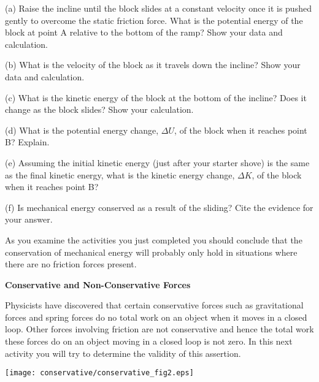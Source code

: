 (a) Raise the incline until the block slides at a constant velocity once it
is pushed gently to overcome the static friction force. What is the potential
energy of the block at point A relative to the bottom of the ramp? Show your
data and calculation.
\vspace{30mm}

\newpage

(b) What is the velocity of the block as it travels down the incline? Show your
data and calculation.
\vspace{20mm}

(c) What is the kinetic energy of the block at the bottom of the incline? Does
it change as the block slides? Show your calculation.
\vspace{20mm}

(d) What is the potential energy change, $\Delta U$, of the block when it reaches point B? Explain.
\vspace{20mm}

(e) Assuming the initial kinetic energy (just after your starter shove) is the
same as the final kinetic energy, what is the kinetic energy change, $\Delta K$, of the block when it reaches point B? 
\vspace{20mm}

(f) Is mechanical energy conserved as a result of the sliding? Cite the evidence for your answer.
\vspace{20mm}

As you examine the activities you just completed you should conclude that the
conservation of mechanical energy will probably only hold in situations where
there are no friction forces present. 

\textbf{Conservative and Non-Conservative Forces} 

Physicists have discovered that certain conservative forces such as gravitational forces and spring forces do no total work on an object when it moves in a closed loop. Other forces involving friction are not conservative and hence the total work these forces do on an object moving in a closed loop is not zero. In this next activity you will try to determine the validity of this assertion.

\vspace{0.3cm}
{\par\centering \texttt{[image: conservative/conservative\_fig2.eps]} \par}
\vspace{0.3cm}

